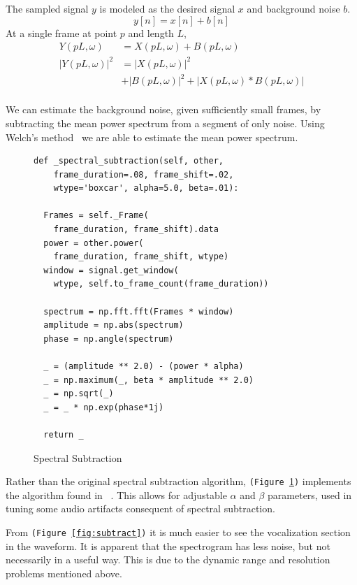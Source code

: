 \documentclass{article}
\begin{document}
\begin{multicols}{2}
The sampled signal $y$ is modeled as the desired signal $x$ and background noise $b$. \[y[n] = x[n] + b[n]\]
At a single frame at point $p$ and length $L$,
\begin{align*}
  Y(pL, \omega) &= X(pL, \omega) + B(pL, \omega)\\
  |Y(pL, \omega)|^2 &= |X(pL, \omega)|^2 \\&+|B(pL, \omega)|^2 + |X(pL, \omega)*B(pL, \omega)|\\
\end{align*}

We can estimate the background noise, given sufficiently small frames, by subtracting the mean power spectrum from a segment of only noise. Using Welch's method~\cite{welch1976} we are able to estimate the mean power spectrum.

\begin{figure}[H]

\begin{lstlisting}
def _spectral_subtraction(self, other,
    frame_duration=.08, frame_shift=.02,
    wtype='boxcar', alpha=5.0, beta=.01):

  Frames = self._Frame(
    frame_duration, frame_shift).data
  power = other.power(
    frame_duration, frame_shift, wtype)
  window = signal.get_window(
    wtype, self.to_frame_count(frame_duration))

  spectrum = np.fft.fft(Frames * window)
  amplitude = np.abs(spectrum)
  phase = np.angle(spectrum)

  _ = (amplitude ** 2.0) - (power * alpha)
  _ = np.maximum(_, beta * amplitude ** 2.0)
  _ = np.sqrt(_)
  _ = _ * np.exp(phase*1j)

  return _
\end{lstlisting}
  \caption{Spectral Subtraction}
  \label{fig:subtractpy}

\end{figure}

Rather than the original spectral subtraction algorithm, \texttt{(Figure~\ref{fig:subtractpy})} implements the algorithm found in ~\cite{Berouti1979EnhancementOS}. This allows for adjustable $\alpha$ and $\beta$ parameters, used in tuning some audio artifacts consequent of spectral subtraction.

From \texttt{(Figure~\ref{fig:subtract})} it is much easier to see the vocalization section in the waveform. It is apparent that the spectrogram has less noise, but not necessarily in a useful way. This is due to the dynamic range and resolution problems mentioned above.



\end{multicols}
\end{document}
